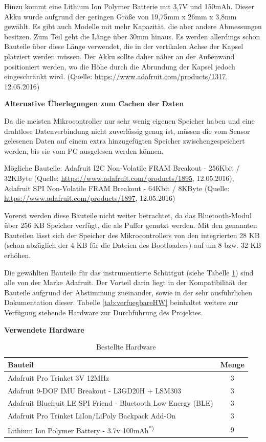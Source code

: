 Hinzu kommt eine Lithium Ion Polymer Batterie mit 3,7V und 150mAh. Dieser Akku wurde aufgrund der geringen Größe von 19,75mm x 26mm x 3,8mm gewählt. Es gibt auch Modelle mit mehr Kapazität, die aber andere Abmessungen besitzen. Zum Teil geht die Länge über 30mm hinaus. Es werden allerdings schon Bauteile über diese Länge verwendet, die in der vertikalen Achse der Kapsel platziert werden müssen. Der Akku sollte daher näher an der Außenwand positioniert werden, wo die Höhe durch die Abrundung der Kapsel jedoch eingeschränkt wird. (Quelle: \url{https://www.adafruit.com/products/1317}, 12.05.2016)

\textbf{Alternative Überlegungen zum Cachen der Daten}

Da die meisten Mikrocontroller nur sehr wenig eigenen Speicher haben und eine drahtlose Datenverbindung nicht zuverlässig genug ist, müssen die vom Sensor gelesenen Daten auf einem extra hinzugefügten Speicher zwischengespeichert werden, bis sie vom PC ausgelesen werden können.

Mögliche Bauteile: Adafruit I2C Non-Volatile FRAM Breakout - 256Kbit / 32KByte (Quelle: \url{https://www.adafruit.com/products/1895}, 12.05.2016), Adafruit SPI Non-Volatile FRAM Breakout - 64Kbit / 8KByte (Quelle: \url{https://www.adafruit.com/products/1897}, 12.05.2016) 

Vorerst werden diese Bauteile nicht weiter betrachtet, da das Bluetooth-Modul über 256 KB Speicher verfügt, die als Puffer genutzt werden.
Mit den genannten Bauteilen lässt sich der Speicher des Mikrocontrollers von den integrierten 28 KB (schon abzüglich der 4 KB für die Dateien des Bootloaders) auf um 8 bzw. 32  KB erhöhen. 

Die gewählten Bauteile für das instrumentierte Schüttgut (siehe Tabelle \ref{tab:bestellteHW}) sind alle von der Marke Adafruit. Der Vorteil darin liegt in der Kompatibilität der Bauteile aufgrund der Abstimmung zueinander, sowie in der sehr ausführlichen Dokumentation dieser. Tabelle \ref{tab:verfuegbareHW} beinhaltet weitere zur Verfügung stehende Hardware zur Durchführung des Projektes.

\textbf{Verwendete Hardware}

\begin{table}[h]
	\centering
	\begin{tabular}{|l|c|}
		\hline
		\textbf{Bauteil} & \textbf{Menge} \\
		\hline
		 Adafruit Pro Trinket 3V 12MHz & 3 \\
		 \hline
		 Adafruit 9-DOF IMU Breakout - L3GD20H + LSM303 & 3 \\
		 \hline
		 Adafruit Bluefruit LE SPI Friend - Bluetooth Low Energy (BLE) & 3 \\
		 \hline
		 Adafruit Pro Trinket LiIon/LiPoly Backpack Add-On & 3 \\
		 \hline
		 Lithium Ion Polymer Battery - 3.7v 100mAh\textsuperscript{*)} & 9 \\
		 \hline		 
	\end{tabular}
		\caption{Bestellte Hardware}
		\label{tab:bestellteHW}
\end{table}

